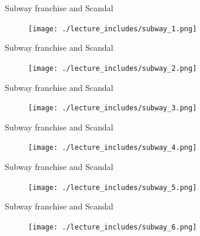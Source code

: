 \documentclass{beamer}
\begin{document}
\begin{frame}{Subway franchise and Scandal}

	\begin{figure}
	\texttt{[image: ./lecture\_includes/subway\_1.png]}
	\end{figure}

\end{frame}


\begin{frame}{Subway franchise and Scandal}

	\begin{figure}
	\texttt{[image: ./lecture\_includes/subway\_2.png]}
	\end{figure}

\end{frame}

\begin{frame}{Subway franchise and Scandal}

	\begin{figure}
	\texttt{[image: ./lecture\_includes/subway\_3.png]}
	\end{figure}

\end{frame}


\begin{frame}{Subway franchise and Scandal}

	\begin{figure}
	\texttt{[image: ./lecture\_includes/subway\_4.png]}
	\end{figure}

\end{frame}

\begin{frame}{Subway franchise and Scandal}

	\begin{figure}
	\texttt{[image: ./lecture\_includes/subway\_5.png]}
	\end{figure}

\end{frame}

\begin{frame}{Subway franchise and Scandal}

	\begin{figure}
	\texttt{[image: ./lecture\_includes/subway\_6.png]}
	\end{figure}

\end{frame}
\end{document}
